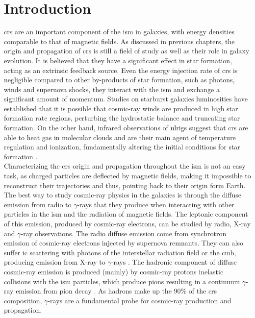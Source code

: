 \documentclass[main.tex]{subfiles}
\begin{document}
\glsresetall
\section{Introduction}

\glspl{cr} are an important component of the \gls{ism} in galaxies, with energy densities comparable to that of magnetic fields. As discussed in previous chapters, the origin and propagation of \glspl{cr} is still a field of study as well as their role in galaxy evolution. It is believed that they have a significant effect in star formation, acting as an extrinsic feedback source. Even the energy injection rate of \glspl{cr} is negligible compared to other by-products of star formation, such as photons, winds and supernova shocks, they interact with the \gls{ism} and exchange a significant amount of momentum. Studies on starburst galaxies luminosities \cite{2008SocratesCRandSF} have established that it is possible that cosmic-ray winds are produced in high star formation rate regions, perturbing the hydrostatic balance and truncating star formation. On the other hand, infrared observations of \gls{ulrigs} suggest that \glspl{cr} are able to heat gas in molecular clouds and are their main agent of temperature regulation and ionization, fundamentally altering the initial conditions for star formation \cite{2010PapadopoulosCRinSF}.\\
Characterizing the \glspl{cr} origin and propagation throughout the \gls{ism} is not an easy task, as charged particles are deflected by magnetic fields, making it impossible to reconstruct their trajectories and thus, pointing back to their origin form Earth. The best way to study cosmic-ray physics in the galaxies is through the diffuse emission from radio to $\gamma$-rays that they produce when interacting with other particles in the \gls{ism} and the radiation of magnetic fields. The leptonic component of this emission, produced by cosmic-ray electrons, can be studied by radio, X-ray and $\gamma$-ray observations. The radio diffuse emission come from synchrotron emission of cosmic-ray electrons injected by supernova remnants. They can also suffer \gls{ic} scattering with photons of the interstellar radiation field or the \gls{cmb}, producing emission from X-ray to $\gamma$-rays \cite{2008ICgammaray}. The hadronic component of diffuse cosmic-ray emission is produced (mainly) by cosmic-ray protons inelastic collisions with the \gls{ism} particles, which produce pions resulting in a continuum $\gamma$-ray emission from pion decay \cite{1963Pimesonsproducegammarays}. As hadrons make up the 90\% of the \glspl{cr} composition, $\gamma$-rays are a fundamental probe for cosmic-ray production and propagation. \\
\end{document}
